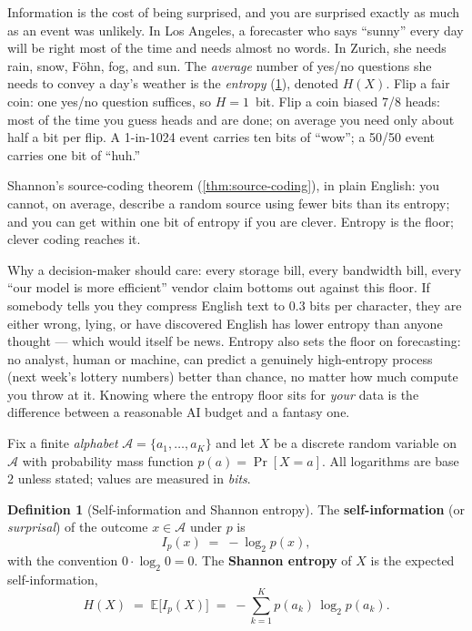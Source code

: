 \documentclass[12pt,a4paper]{article}
\theoremstyle{plain}
\theoremstyle{definition}
\newtheorem{definition}[theorem]{Definition}
\begin{document}
\begin{intuition}
Information is the cost of being surprised, and you are surprised
exactly as much as an event was unlikely.  In Los Angeles, a
forecaster who says ``sunny'' every day will be right most of the
time and needs almost no words.  In Zurich, she needs rain, snow,
F\"{o}hn, fog, and sun.  The \emph{average} number of yes/no questions
she needs to convey a day's weather is the \emph{entropy}
(\cref{def:entropy}), denoted $H(X)$.  Flip a fair coin: one yes/no
question suffices, so $H = 1$~bit.  Flip a coin biased 7/8 heads:
most of the time you guess heads and are done; on average you need
only about half a bit per flip.  A 1-in-1024 event carries ten bits
of ``wow''; a 50/50 event carries one bit of ``huh.''

Shannon's source-coding theorem (\cref{thm:source-coding}), in plain
English: you cannot, on average, describe a random source using fewer
bits than its entropy; and you can get within one bit of entropy if
you are clever.  Entropy is the floor; clever coding reaches it.

Why a decision-maker should care: every storage bill, every bandwidth
bill, every ``our model is more efficient'' vendor claim bottoms out
against this floor.  If somebody tells you they compress English text
to $0.3$ bits per character, they are either wrong, lying, or have
discovered English has lower entropy than anyone thought --- which
would itself be news.  Entropy also sets the floor on forecasting:
no analyst, human or machine, can predict a genuinely high-entropy
process (next week's lottery numbers) better than chance, no matter
how much compute you throw at it.  Knowing where the entropy floor
sits for \emph{your} data is the difference between a reasonable AI
budget and a fantasy one.
\end{intuition}

Fix a finite \emph{alphabet} $\mathcal{A} = \{a_1, \dots, a_K\}$ and
let $X$ be a discrete random variable on $\mathcal{A}$ with
probability mass function $p(a) = \Pr[X = a]$.  All logarithms are
base $2$ unless stated; values are measured in \emph{bits}.

\begin{definition}[Self-information and Shannon entropy]
\label{def:entropy}
The \textbf{self-information} (or \emph{surprisal}) of the outcome
$x \in \mathcal{A}$ under $p$ is
\begin{equation}
  I_p(x) \;=\; -\log_2 p(x),
  \label{eq:self-info}
\end{equation}
with the convention $0 \cdot \log_2 0 = 0$.  The \textbf{Shannon
entropy} of $X$ is the expected self-information,
\begin{equation}
  H(X) \;=\; \mathbb{E}\bigl[I_p(X)\bigr]
       \;=\; -\sum_{k=1}^{K} p(a_k)\,\log_2 p(a_k).
  \label{eq:entropy}
\end{equation}
\end{definition}
\end{document}
